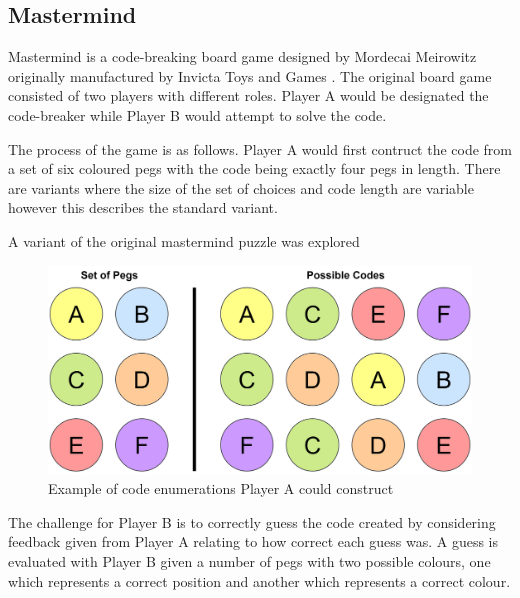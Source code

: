 \documentclass[12pt]{article}  %
\theoremstyle{definition}
\theoremstyle{remark}
\begin{document}
\subsection {Mastermind}
Mastermind is a code-breaking board game designed by Mordecai Meirowitz originally manufactured by Invicta Toys and Games \cite{Invicta}. 
The original board game consisted of two players with different roles. Player A would be designated the code-breaker while Player B would attempt to solve the code.

The process of the game is as follows.
Player A would first contruct the code from a set of six coloured pegs with the code being exactly four pegs in length. There are variants where the size of the set of choices and code length are variable however this describes the standard variant.

A variant of the original mastermind puzzle was explored 

\begin{figure}[H]
\centering
\includegraphics[scale=0.75]{pegs}
\caption{ Example of code enumerations Player A could construct}
\end{figure}

The challenge for Player B is to correctly guess the code created by considering feedback given from Player A relating to how correct each guess was.
A guess is evaluated with Player B given a number of pegs with two possible colours, one which represents a correct position and another which represents a correct colour.
\end{document}
